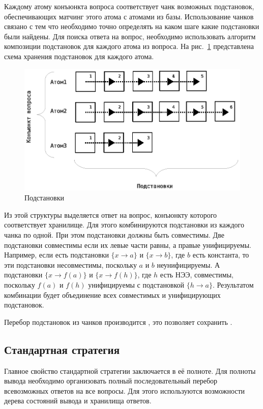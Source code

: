 Каждому атому конъюнкта вопроса соответствует чанк возможных подстановок, обеспечивающих матчинг этого атома с атомами из базы. Использование чанков связано с тем что необходимо точно определять на каком шаге какие подстановки были найдены. Для поиска ответа на вопрос, необходимо использовать алгоритм композиции подстановок для каждого атома из вопроса. На рис.~\ref{fig:anbase} представлена схема хранения подстановок для каждого атома.
\begin{figure}[h]
	\centering
	\includegraphics[width=0.6\linewidth]{pics/AnBase.eps}
	\caption{Подстановки}
	\label{fig:anbase}
\end{figure}

Из этой структуры выделяется ответ на вопрос, конъюнкту которого соответствует хранилище. Для этого комбинируются подстановки из каждого чанка по одной. При этом подстановки должны быть совместимы. Две подстановки совместимы если их левые части равны, а правые унифицируемы. Например, если есть подстановки $\{x \rightarrow a\}$ и $\{x \rightarrow b\}$, где $b$ есть константа, то эти подстановки несовместимы, поскольку $a$ и $b$ неунифицируемы. А подстановки $\{x \rightarrow f(a)\}$ и $\{x \rightarrow f(h)\}$, где $h$ есть НЭЭ, совместимы, поскольку $f(a)$ и $f(h)$ унифицируемы с подстановкой $\{h \rightarrow a\}$. Результатом комбинации будет объединение всех совместимых и унифицирующих подстановок.

Перебор подстановок из чанков производится , это позволяет сохранить .

\subsection{Стандартная стратегия }
Главное свойство стандартной стратегии  заключается в её полноте. Для полноты вывода необходимо организовать полный последовательный перебор всевозможных ответов на все вопросы. Для этого используются возможности дерева состояний вывода и хранилища ответов. 


